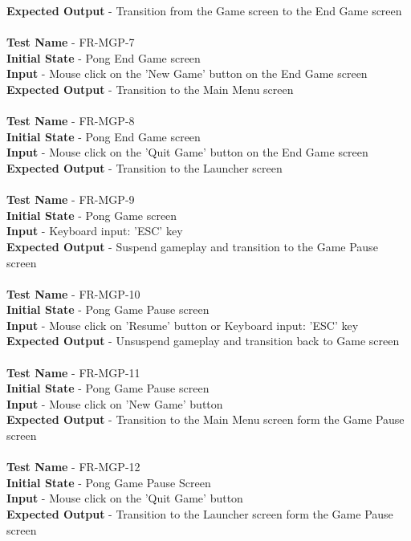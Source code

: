 \documentclass[12pt, titlepage]{article}
\begin{document}
\textbf{Expected Output} - Transition from the Game screen to the End Game screen\\ \\
\textbf{Test Name} - FR-MGP-7\\
\textbf{Initial State} - Pong End Game screen\\
\textbf{Input} - Mouse click on the 'New Game' button on the End Game screen\\
\textbf{Expected Output} - Transition to the Main Menu screen\\ \\
\textbf{Test Name} - FR-MGP-8\\
\textbf{Initial State} - Pong End Game screen\\
\textbf{Input} - Mouse click on the 'Quit Game' button on the End Game screen\\
\textbf{Expected Output} - Transition to the Launcher screen\\ \\
\textbf{Test Name} - FR-MGP-9\\
\textbf{Initial State} - Pong Game screen\\
\textbf{Input} - Keyboard input: 'ESC' key\\
\textbf{Expected Output} - Suspend gameplay and transition to the Game Pause screen\\ \\
\textbf{Test Name} - FR-MGP-10\\
\textbf{Initial State} - Pong Game Pause screen\\
\textbf{Input} - Mouse click on 'Resume' button or Keyboard input: 'ESC' key\\
\textbf{Expected Output} - Unsuspend gameplay and transition back to Game screen\\ \\
\textbf{Test Name} - FR-MGP-11\\
\textbf{Initial State} - Pong Game Pause screen\\
\textbf{Input} - Mouse click on 'New Game' button\\
\textbf{Expected Output} - Transition to the Main Menu screen form the Game Pause screen\\ \\
\textbf{Test Name} - FR-MGP-12\\
\textbf{Initial State} - Pong Game Pause Screen\\
\textbf{Input} - Mouse click on the 'Quit Game' button\\
\textbf{Expected Output} - Transition to the Launcher screen form the Game Pause screen\\ \\
\end{document}
